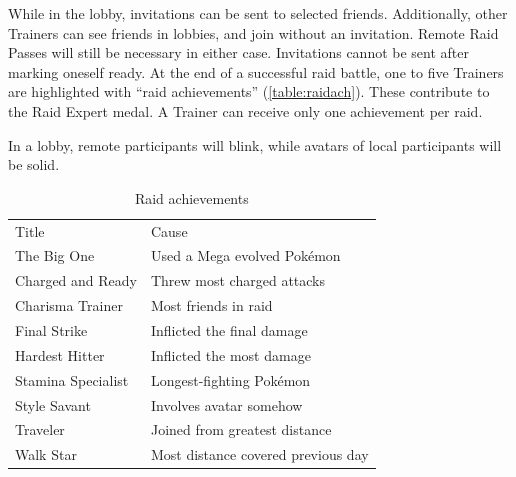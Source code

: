 While in the lobby, invitations can be sent to selected friends.
Additionally, other Trainers can see friends in lobbies, and join without an invitation.
Remote Raid Passes will still be necessary in either case.
Invitations cannot be sent after marking oneself ready.
At the end of a successful raid battle, one to five Trainers
 are highlighted with ``raid achievements'' (\autoref{table:raidach}).
These contribute to the Raid Expert medal.
A Trainer can receive only one achievement per raid.
\begin{tipbox}[title=Spooky raiding at a distance]
In a lobby, remote participants will blink, while avatars of local participants will be solid.
\end{tipbox}
\begin{table}
\centering
\begin{tabular}{ll}
Title & Cause\\
\Midrule
The Big One & Used a Mega evolved Pokémon\\
Charged and Ready & Threw most charged attacks\\
Charisma Trainer & Most friends in raid\\
Final Strike & Inflicted the final damage\\
Hardest Hitter & Inflicted the most damage\\
Stamina Specialist & Longest-fighting Pokémon\\
Style Savant & Involves avatar somehow\\
Traveler & Joined from greatest distance\\
Walk Star & Most distance covered previous day\\
\end{tabular}
\caption{Raid achievements\label{table:raidach}}
\end{table}

